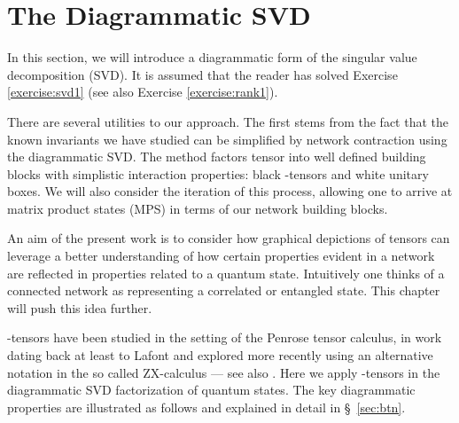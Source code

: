 \section{The Diagrammatic SVD}

In this section, we will introduce a diagrammatic form of the singular
value decomposition (SVD).  It is assumed that the reader has solved Exercise \ref{exercise:svd1} (see also Exercise \ref{exercise:rank1}). 

There are several utilities to our
approach.  The first stems from the fact that the known invariants we
have studied can be simplified by network contraction using the diagrammatic SVD.   
The method factors tensor into well defined building blocks
with simplistic interaction properties: black \COPY-tensors and white
unitary boxes.  We will also consider the iteration of this process, allowing one to arrive at matrix product states (MPS) in terms of our network building blocks. 

An aim of the present work is to consider how graphical depictions of tensors can leverage a better understanding of how certain properties evident in a network are reflected in properties related to a quantum state.  Intuitively one thinks of a connected network as representing a correlated or entangled state.  This chapter will push this idea further.  





\COPY{}-tensors have been studied in the setting of the Penrose
tensor calculus, in work dating back at least to Lafont \cite{boolean03} and explored more recently using an alternative notation in the so called ZX-calculus \cite{CD, redgreen} --- see also \cite{BB11, CTNS}.
Here we apply \COPY{}-tensors in the diagrammatic SVD factorization of quantum states.  The key diagrammatic properties are illustrated as follows and explained in detail in \S~\ref{sec:btn}.  

